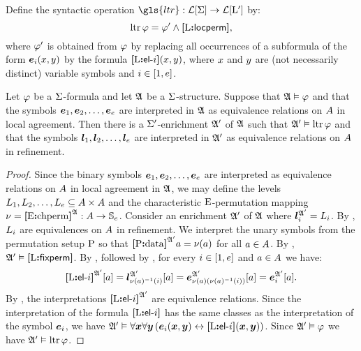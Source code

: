\begin{definition}
Define the syntactic operation $\gls{ltr} : \FoF\SigS \to \FoF\LSp$ by:
\[
  \operatorname{ltr}\varphi = {\varphi'} \land {\bm{[}{\mathrm{L}}\mathord{\bm{:}}\mathsf{locperm}\bm{]}},
\]
where ${\varphi'}$ is obtained from $\varphi$ by replacing all occurrences of a
subformula of the form $\bm{e}_{i}(x,y)$ by the formula ${\bm{[}{\mathrm{L}}\mathord{\bm{:}}\mathsf{el}{\hbox{-}}i\bm{]}}(x,y)$, 
where $x$ and $y$ are (not necessarily distinct) variable symbols and
$i \in [1,e]$.
\end{definition}
\begin{remark}
Let $\varphi$ be a $\mathrm{\Sigma}$-formula and let $\mathfrak{A}$ be a $\mathrm{\Sigma}$-structure.
Suppose that $\mathfrak{A} \vDash \varphi$ and that the symbols 
$\bm{e}_{1}, \bm{e}_{2}, \dots, \bm{e}_{e}$ are interpreted in $\mathfrak{A}$ as equivalence
relations on $A$ in local agreement.
Then there is a $\mathrm{\Sigma'}$-enrichment $\mathfrak{A'}$ of $\mathfrak{A}$ such that
$\mathfrak{A'} \vDash \operatorname{ltr}\varphi$ and that the symbols 
$\bm{l}_{1}, \bm{l}_{2}, \dots, \bm{l}_{e}$ are interpreted in $\mathfrak{A'}$ as equivalence
relations on $A$ in refinement.
\end{remark}
\begin{proof}
Since the binary symbols $\bm{e}_{1}, \bm{e}_{2}, \dots, \bm{e}_{e}$ are interpreted as
equivalence relations on $A$ in local agreement in $\mathfrak{A}$, we may define
the levels $L_{1}, L_{2}, \dots, L_{e} \subseteq {A\times A}$
and the characteristic ${\mathrm{E}}$-permutation mapping 
$\nu = {\bm{[}{\mathrm{E}}\mathord{\bm{:}}\mathrm{chperm}\bm{]}}^{\mathfrak{A}} : A \to \mathbb{S}_{e}$.
Consider an enrichment $\mathfrak{A'}$ of $\mathfrak{A}$ where 
$\bm{l}_{i}^{\mathfrak{A'}} = L_{i}$.
By , $L_{i}$ are equivalences on $A$ in
refinement.
We interpret the unary symbols from the
permutation setup ${\mathrm{P}}$ so that ${\bm{[}{\mathrm{P}}\mathord{\bm{:}}\mathrm{data}\bm{]}}^{\mathfrak{A'}}a = \nu(a)$ for all
$a \in A$.
By , $\mathfrak{A'} \vDash {\bm{[}{\mathrm{L}}\mathord{\bm{:}}\mathsf{fixperm}\bm{]}}$.
By , followed by ,
for every $i \in [1,e]$ and $a \in A$ we have:
\[
  {\bm{[}{\mathrm{L}}\mathord{\bm{:}}\mathsf{el}{\hbox{-}}i\bm{]}}^{\mathfrak{A'}}[a] =
  \bm{l}_{\nu(a)^{-1}(i)}^{\mathfrak{A'}}[a] =
  \bm{e}_{\nu(a)(\nu(a)^{-1}(i))}^{\mathfrak{A'}}[a] =
  \bm{e}_{i}^{\mathfrak{A'}}[a].
\]
By , the interpretations ${\bm{[}{\mathrm{L}}\mathord{\bm{:}}\mathsf{el}{\hbox{-}}i\bm{]}}^{\mathfrak{A'}}$ are
equivalence relations. Since the interpretation of the formula
${\bm{[}{\mathrm{L}}\mathord{\bm{:}}\mathsf{el}{\hbox{-}}i\bm{]}}$ has the same classes as the interpretation of the symbol $\bm{e}_{i}$,
we have $\mathfrak{A'} \vDash \forall\bm{x} \forall\bm{y}
\left(\bm{e}_{i}(\bm{x},\bm{y}) \leftrightarrow {\bm{[}{\mathrm{L}}\mathord{\bm{:}}\mathsf{el}{\hbox{-}}i\bm{]}}(\bm{x},\bm{y})\right)$.
Since $\mathfrak{A'} \vDash \varphi$ we have $\mathfrak{A'} \vDash \operatorname{ltr}\varphi$.
\end{proof}

